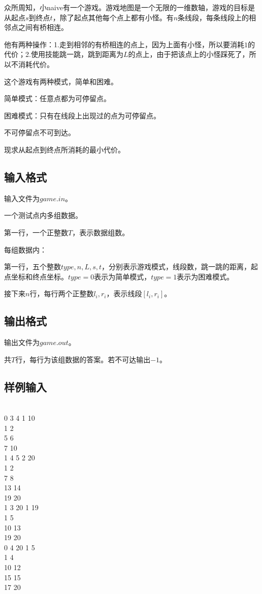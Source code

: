 \documentclass{ctexart}
\begin{document}
众所周知，小naive有一个游戏。游戏地图是一个无限的一维数轴，游戏的目标是从起点$s$到终点$t$，除了起点其他每个点上都有小怪。有$n$条线段，每条线段上的相邻点之间有桥相连。 \par
 他有两种操作：1.走到相邻的有桥相连的点上，因为上面有小怪，所以要消耗$1$的代价；2.使用技能跳一跳，跳到距离为$L$的点上，由于把该点上的小怪踩死了，所以不消耗代价。 \par
这个游戏有两种模式，简单和困难。 \par
简单模式：任意点都为可停留点。 \par
困难模式：只有在线段上出现过的点为可停留点。 \par
不可停留点不可到达。 \par
现求从起点到终点所消耗的最小代价。 \par


\subsection{输入格式}

输入文件为$game.in$。 \par
一个测试点内多组数据。 \par
第一行，一个正整数$T$，表示数据组数。 \par
每组数据内： \par
第一行，五个整数$type, n, L, s, t$，分别表示游戏模式，线段数，跳一跳的距离，起点坐标和终点坐标。$type = 0$表示为简单模式，$type = 1$表示为困难模式。 \par
接下来$n$行，每行两个正整数$l_i, r_i$，表示线段$[l_i, r_i]$。 \par


\subsection{输出格式}

输出文件为$game.out$。 \par
共$T$行，每行为该组数据的答案。若不可达输出$-1$。 \par


\subsection{样例输入}

 \\
0 3 4 1 10 \\
1 2 \\
5 6 \\
7 10 \\
1 4 5 2 20 \\
1 2 \\
7 8 \\
13 14 \\
19 20 \\
1 3 20 1 19 \\
1 5 \\
10 13 \\
19 20 \\
0 4 20 1 5 \\
1 4 \\
10 12 \\
15 15 \\
17 20 \\
\end{document}
